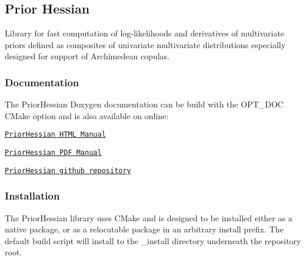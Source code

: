 \href{https://travis-ci.org/markjolah/PriorHessian}{\tt }

\subsection*{Prior Hessian}

Library for fast computation of log-\/likelihoods and derivatives of multivariate priors defined as composites of univariate multivariate distributions especially designed for support of Archimedean copulas.

\subsubsection*{Documentation}

The Prior\+Hessian Doxygen documentation can be build with the {\ttfamily O\+P\+T\+\_\+\+D\+OC} C\+Make option and is also available on online\+:
\begin{DoxyItemize}
\item \href{https://markjolah.github.io/PriorHessian/index.html}{\tt Prior\+Hessian H\+T\+ML Manual}
\item \href{https://markjolah.github.io/PriorHessian/pdf/PriorHessian-0.2-reference.pdf}{\tt Prior\+Hessian P\+DF Manual}
\item \href{https://github.com/markjolah/PriorHessian}{\tt Prior\+Hessian github repository}
\end{DoxyItemize}

\subsubsection*{Installation}

The Prior\+Hessian library uses C\+Make and is designed to be installed either as a native package, or as a relocatable package in an arbitrary install prefix. The default build script will install to the {\ttfamily \+\_\+install} directory underneath the repository root.


